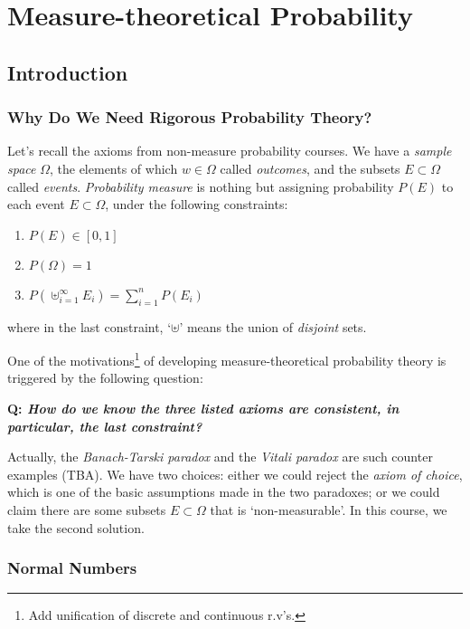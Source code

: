 \documentclass{memoir}
\begin{document}
\newpage
\part{Measure-theoretical Probability}
\chapter{Introduction}
\section{Why Do We Need Rigorous Probability Theory?}
Let's recall the axioms from non-measure probability courses. We have a \emph{sample space} $\Omega$, the elements of which $w \in \Omega$ called \emph{outcomes}, and the subsets $E \subset \Omega$ called \emph{events}. \emph{Probability measure} is nothing but assigning probability $P(E)$ to each event $E \subset \Omega$, under the following constraints:
\begin{enumerate}
	\item $P(E) \in [0,1]$
	\item $P(\Omega) = 1$
	\item $P(\uplus_{i=1}^\infty E_i) = \sum_{i=1}^n P(E_i)$
\end{enumerate}
where in the last constraint, `$\uplus$' means the union of \emph{disjoint} sets.

One of the motivations\footnote{Add unification of discrete and continuous r.v's.} of developing measure-theoretical probability theory is triggered by the following question:

\vspace{2 mm}
\textbf{Q: \emph{How do we know the three listed axioms are consistent, in particular, the last constraint?}}
\vspace{0.5 mm}

Actually, the \emph{Banach-Tarski paradox} and the \emph{Vitali paradox} are such counter examples (TBA). We have two choices: either we could reject the \emph{axiom of choice}, which is one of the basic assumptions made in the two paradoxes; or we could claim there are some subsets $E \subset \Omega$ that is `non-measurable'. In this course, we take the second solution.

\section{Normal Numbers}
\end{document}
